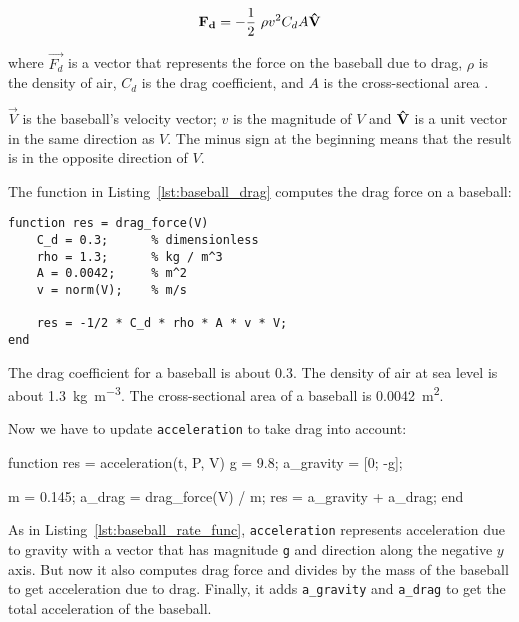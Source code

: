 \begin{equation}
    \vec{F_d} = - \frac{1}{2} ~ \rho v^2 C_d A \uvec{V}
\end{equation}

where $\vec{F_d}$ is a vector that represents the force on the baseball
due to drag, 
$\rho$ is the density of air, 
$C_d$ is the drag coefficient, and
$A$ is the cross-sectional area .


$\vec{V}$ is the baseball's velocity vector; $v$ is the magnitude of $V$ and $\uvec{V}$ is a unit vector in the same direction as $V$.  The minus sign at the beginning means that the result is in the opposite direction of $V$.


The function in Listing~\ref{lst:baseball_drag} computes the drag force on a baseball:

\begin{lstlisting}[caption={A function that calculates the drag force on a baseball}, label={lst:baseball_drag}]
 function res = drag_force(V)
    C_d = 0.3;      % dimensionless
    rho = 1.3;      % kg / m^3
    A = 0.0042;     % m^2
    v = norm(V);    % m/s

    res = -1/2 * C_d * rho * A * v * V;
end
\end{lstlisting}
  
The drag coefficient for a baseball is about 0.3.  
The density of air at sea level is about \SI{1.3}{\kilogram\per\meter\cubed}.
The cross-sectional area of a baseball is \SI{0.0042}{\meter\squared}.


Now we have to update {\tt acceleration} to take drag into account:

\begin{code}
function res = acceleration(t, P, V)
    g = 9.8;                       %
    a_gravity = [0; -g];

    m = 0.145;                     %
    a_drag = drag_force(V) / m;
    res = a_gravity + a_drag;
end
\end{code}

As in Listing~\ref{lst:baseball_rate_func}, {\tt acceleration} represents acceleration due to gravity with a vector that has magnitude {\tt g} and direction along the negative $y$ axis.
But now it also computes drag force and divides by the mass of the baseball to get acceleration due to drag.
Finally, it adds \verb"a_gravity" and \verb"a_drag" to get the total acceleration of the baseball.

